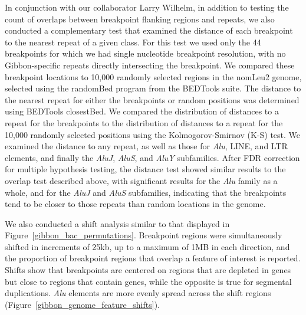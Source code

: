 In conjunction with our collaborator Larry Wilhelm, in addition to testing the count of overlaps between breakpoint flanking regions and repeats, we also conducted a complementary test that examined the distance of each breakpoint to the nearest repeat of a given class. For this test we used only the 44 breakpoints for which we had single nucleotide breakpoint resolution, with no Gibbon-specific repeats directly intersecting the breakpoint. We compared these breakpoint locations to 10,000 randomly selected regions in the nomLeu2 genome, selected using the randomBed program from the BEDTools suite. The distance to the nearest repeat for either the breakpoints or random positions was determined using BEDTools closestBed.  We compared the distribution of distances to a repeat for the breakpoints to the distribution of distances to a repeat for the 10,000 randomly selected positions using the Kolmogorov-Smirnov (K-S) test. We examined the distance to any repeat, as well as those for \emph{Alu}, LINE, and LTR elements, and finally the \emph{AluJ}, \emph{AluS}, and \emph{AluY} subfamilies. After FDR correction for multiple hypothesis testing, the distance test showed similar results to the overlap test described above, with significant results for the \emph{Alu} family as a whole, and for the \emph{AluJ} and \emph{AluS} subfamilies, indicating that the breakpoints tend to be closer to those repeats than random locations in the genome.

We also conducted a shift analysis similar to that displayed in Figure~\ref{gibbon_bac_permutations}. Breakpoint regions were simultaneously shifted in increments of 25kb, up to a maximum of 1MB in each direction, and the proportion of breakpoint regions that overlap a feature of interest is reported. Shifts show that breakpoints are centered on regions that are depleted in genes but close to regions that contain genes, while the opposite is true for segmental duplications. \emph{Alu} elements are more evenly spread across the shift regions (Figure~\ref{gibbon_genome_feature_shifts}).

